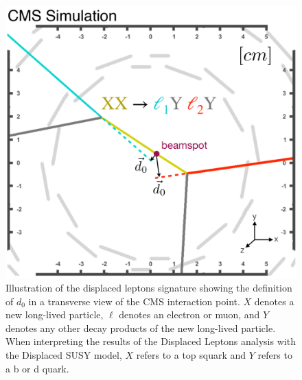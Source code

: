 \begin{figure}[hbtp]
\centering
\includegraphics[scale=0.4]{figures/overview/signalEventDisplay.pdf}
\caption{Illustration of the displaced leptons signature showing the definition of $d_0$ in a transverse view of the CMS interaction point. $X$ denotes a new long-lived particle, $\ell$ denotes an electron or muon, and $Y$ denotes any other decay products of the new long-lived particle. When interpreting the results of the Displaced Leptons analysis with the Displaced SUSY model, $X$ refers to a top squark and $Y$ refers to a b or d quark.} 
\label{displaced_leptons_cartoon}
\end{figure}